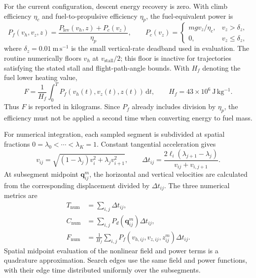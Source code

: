 For the current configuration, descent energy recovery is zero. With
climb efficiency $\eta_c$ and fuel-to-propulsive efficiency $\eta_p$,
the fuel-equivalent power is
\begin{equation}
 P_f(v_h,v_z,z)=\frac{P_{\mathrm{lev}}(v_h,z)+P_c(v_z)}{\eta_p},
 \qquad
 P_c(v_z)=
 \begin{cases}
  mgv_z/\eta_c, & v_z>\delta_z,\\
  0, & v_z\le\delta_z,
 \end{cases}
 \label{pr:eq:fuelpower}
\end{equation}
where $\delta_z=0.01~\mathrm{m\,s^{-1}}$ is the small vertical-rate
deadband used in evaluation. The routine numerically floors $v_h$ at
$v_{\mathrm{stall}}/2$; this floor is inactive for trajectories satisfying
the stated stall and flight-path-angle bounds. With $H_f$ denoting the fuel
lower heating value,
\begin{equation}
 F=\frac{1}{H_f}\int_0^T
 P_f(v_h(t),v_z(t),z(t))\,\mathrm{d}t,
 \qquad H_f=43\times10^6~\mathrm{J\,kg^{-1}}.
 \label{pr:eq:fuel}
\end{equation}
Thus $F$ is reported in kilograms. Since $P_f$ already includes division
by $\eta_p$, the efficiency must not be applied a second time when
converting energy to fuel mass.

For numerical integration, each sampled segment is subdivided at spatial
fractions $0=\lambda_0<\cdots<\lambda_K=1$. Constant tangential acceleration
gives
\begin{equation}
 v_{ij}=\sqrt{(1-\lambda_j)v_i^2+\lambda_j v_{i+1}^2},\qquad
 \Delta t_{ij}=\frac{2\ell_i(\lambda_{j+1}-\lambda_j)}{v_{ij}+v_{i,j+1}}.
 \label{pr:eq:subtime}
\end{equation}
At subsegment midpoint $\mathbf{q}_{ij}^{m}$, the horizontal and vertical
velocities are calculated from the corresponding displacement divided by
$\Delta t_{ij}$. The three numerical metrics are
\begin{equation}
 \begin{aligned}
 T_{\mathrm{num}}&=\sum_{i,j}\Delta t_{ij},\\
 C_{\mathrm{num}}&=\sum_{i,j}P_d(\mathbf{q}_{ij}^{m})\Delta t_{ij},\\
 F_{\mathrm{num}}&=\frac{1}{H_f}\sum_{i,j}
 P_f(v_{h,ij},v_{z,ij},z_{ij}^{m})\Delta t_{ij}.
 \end{aligned}
 \label{pr:eq:quadrature}
\end{equation}
Spatial midpoint evaluation of the nonlinear field and power terms is a
quadrature approximation. Search edges use the same field and power
functions, with their edge time distributed uniformly over the subsegments.

